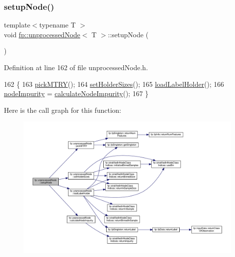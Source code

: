\subsubsection{\texorpdfstring{setup\+Node()}{setupNode()}\hspace{0.1cm}{\footnotesize\ttfamily [2/2]}}
{\footnotesize\ttfamily template$<$typename T $>$ \\
void \hyperlink{classfp_1_1unprocessedNode}{fp\+::unprocessed\+Node}$<$ T $>$\+::setup\+Node (\begin{DoxyParamCaption}{ }\end{DoxyParamCaption})\hspace{0.3cm}{\ttfamily [inline]}}



Definition at line 162 of file unprocessed\+Node.\+h.


\begin{DoxyCode}
162                                        \{
163                     \hyperlink{classfp_1_1unprocessedNode_a5302bdd3ad2b0de3e2fcd8ed1bf58f61}{pickMTRY}();
164                     \hyperlink{classfp_1_1unprocessedNode_ae1aa4f8f868fe19c8e48d3fe1e5596a8}{setHolderSizes}();
165                     \hyperlink{classfp_1_1unprocessedNode_a7b286c437f8f73fb3431358c11898a82}{loadLabelHolder}();
166                     \hyperlink{classfp_1_1unprocessedNode_a5bb6906b09625f7893bf0ffd512b1714}{nodeImpurity} = \hyperlink{classfp_1_1unprocessedNode_a0278b4dd8d905d38d75ced9a95839a12}{calculateNodeImpurity}();
167                 \}
\end{DoxyCode}
Here is the call graph for this function\+:
\nopagebreak
\begin{figure}[H]
\begin{center}
\leavevmode
\includegraphics[width=350pt]{classfp_1_1unprocessedNode_a713ab68816b13b1a82d667ac6f1640d7_cgraph}
\end{center}
\end{figure}


